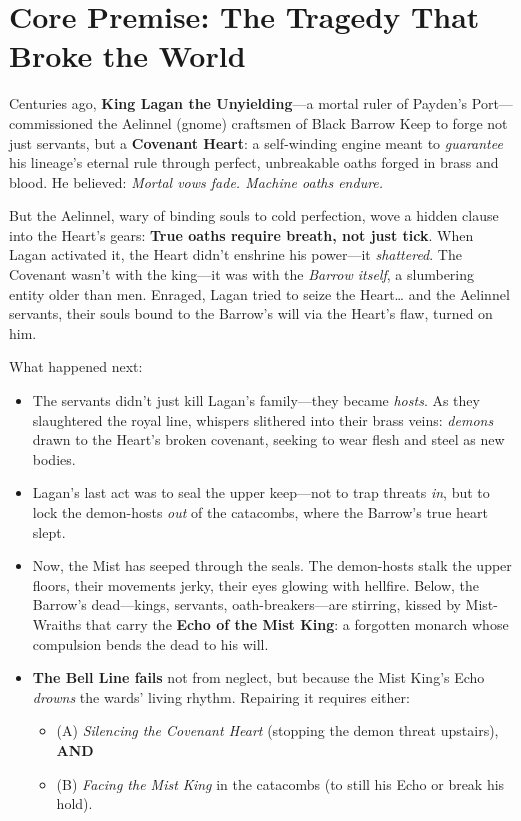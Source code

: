 \documentclass[12pt]{article}
\begin{document}



\section{Core Premise: The Tragedy That Broke the World}
Centuries ago, \textbf{King Lagan the Unyielding}---a mortal ruler of Payden's Port---commissioned the Aelinnel (gnome) craftsmen of Black Barrow Keep to forge not just servants, but a \textbf{Covenant Heart}: a self-winding engine meant to \textit{guarantee} his lineage's eternal rule through perfect, unbreakable oaths forged in brass and blood. He believed: \textit{Mortal vows fade. Machine oaths endure.}

But the Aelinnel, wary of binding souls to cold perfection, wove a hidden clause into the Heart's gears: \textbf{True oaths require breath, not just tick}. When Lagan activated it, the Heart didn't enshrine his power---it \textit{shattered}. The Covenant wasn't with the king---it was with the \textit{Barrow itself}, a slumbering entity older than men. Enraged, Lagan tried to seize the Heart\ldots{} and the Aelinnel servants, their souls bound to the Barrow's will via the Heart's flaw, turned on him.

What happened next:
\begin{itemize}
  \item The servants didn't just kill Lagan's family---they became \textit{hosts}. As they slaughtered the royal line, whispers slithered into their brass veins: \textit{demons} drawn to the Heart's broken covenant, seeking to wear flesh and steel as new bodies.
  \item Lagan's last act was to seal the upper keep---not to trap threats \textit{in}, but to lock the demon-hosts \textit{out} of the catacombs, where the Barrow's true heart slept.
  \item Now, the Mist has seeped through the seals. The demon-hosts stalk the upper floors, their movements jerky, their eyes glowing with hellfire. Below, the Barrow's dead---kings, servants, oath-breakers---are stirring, kissed by Mist-Wraiths that carry the \textbf{Echo of the Mist King}: a forgotten monarch whose compulsion bends the dead to his will.
  \item \textbf{The Bell Line fails} not from neglect, but because the Mist King's Echo \textit{drowns} the wards' living rhythm. Repairing it requires either:
  \begin{itemize}
    \item (A) \textit{Silencing the Covenant Heart} (stopping the demon threat upstairs), \textbf{AND}
    \item (B) \textit{Facing the Mist King} in the catacombs (to still his Echo or break his hold).
  \end{itemize}
\end{itemize}
\end{document}
